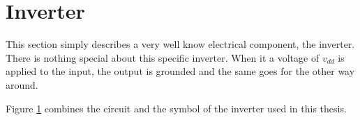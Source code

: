 \section{Inverter}
\label{sec:inv}

This section simply describes a very well know electrical component, the inverter. There is nothing special about this specific inverter. When it a voltage of $v_{dd}$ is applied to the input, the output is grounded and the same goes for the other way around.

\begin{figure}[H]
  \centering
  \hspace*{1.5cm}
  \hfill
  \hspace*{1.5cm}
  \caption{}
  \label{fig:inv}
\end{figure}

Figure \ref{fig:inv} combines the circuit and the symbol of the inverter used in this thesis.
